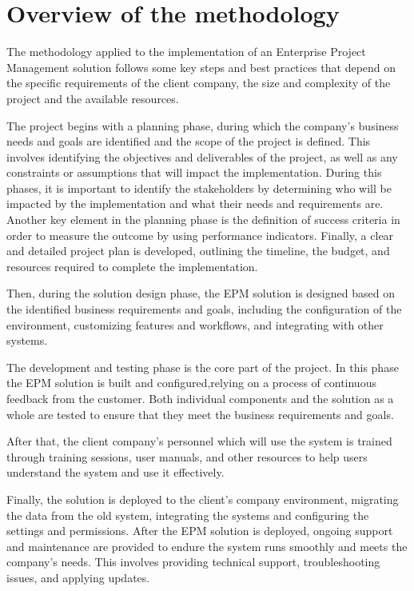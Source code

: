 \documentclass[12pt,a4paper,openright,twoside]{book}
\begin{document}
\section{Overview of the methodology}

The methodology applied to the implementation of an Enterprise Project Management solution follows some key steps and best practices that depend on the specific requirements of the client company, the size and complexity of the project and the available resources.

The project begins with a planning phase, during which the company's business needs and goals are identified and the scope of the project is defined.
%
This involves identifying the objectives and deliverables of the project, as well as any constraints or assumptions that will impact the implementation.
%
During this phases, it is important to identify the stakeholders by determining who will be impacted by the implementation and what their needs and requirements are.
%
Another key element in the planning phase is the definition of success criteria in order to measure the outcome by using performance indicators.
%
Finally, a clear and detailed project plan is developed, outlining the timeline, the budget, and resources required to complete the implementation.

Then, during the solution design phase, the EPM solution is designed based on the identified business requirements and goals, including the configuration of the environment, customizing features and workflows, and integrating with other systems.

The development and testing phase is the core part of the project.
%
In this phase the EPM solution is built and configured,relying on a process of continuous feedback from the customer.
%
Both individual components and the solution as a whole are tested to ensure that they meet the business requirements and goals.

After that, the client company's personnel which will use the system is trained through training sessions, user manuals, and other resources to help users understand the system and use it effectively.

Finally, the solution is deployed to the client's company environment, migrating the data from the old system, integrating the systems and configuring the settings and permissions.
%
After the EPM solution is deployed, ongoing support and maintenance are provided to endure the system runs smoothly and meets the company's needs.
%
This involves providing technical support, troubleshooting issues, and applying updates.
\end{document}
